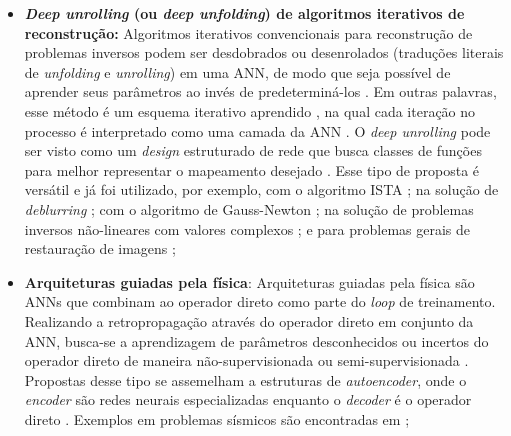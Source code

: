 \begin{itemize}

\item \textbf{\textit{Deep unrolling} (ou \textit{deep unfolding}) de algoritmos iterativos de reconstrução:} Algoritmos iterativos convencionais para reconstrução de problemas inversos podem ser desdobrados ou desenrolados (traduções literais de \textit{unfolding} e \textit{unrolling}) em uma ANN, de modo que seja possível de aprender seus parâmetros ao invés de predeterminá-los \cite{Bai2020, Monga2021}. Em outras palavras, esse método é um esquema iterativo aprendido \cite[Subseção 5.1.4]{Arridge2019}, na qual cada iteração no processo é interpretado como uma camada da ANN \cite{Arridge1}. O \textit{deep unrolling} pode ser visto como um \textit{design} estruturado de rede que busca classes de funções para melhor representar o mapeamento desejado \cite[Seção 4.2]{Bai2020}. Esse tipo de proposta é versátil e já foi utilizado, por exemplo, com o algoritmo ISTA \cite{Zhang2018}; na solução de \textit{deblurring} \cite{Li2019unfolding}; com o algoritmo de Gauss-Newton \cite{Yang2020}; na solução de problemas inversos não-lineares com valores complexos \cite{Takabe2020}; e para problemas gerais de restauração de imagens \cite{Mou2022};

\item \textbf{Arquiteturas guiadas pela física}: Arquiteturas guiadas pela física são ANNs que combinam ao operador direto como parte do \textit{loop} de treinamento. Realizando a retropropagação através do operador direto em conjunto da ANN, busca-se a aprendizagem de parâmetros desconhecidos ou incertos do operador direto de maneira não-supervisionada ou semi-supervisionada \cite{Adler2021}. Propostas desse tipo se assemelham a estruturas de \textit{autoencoder}, onde o \textit{encoder} são redes neurais especializadas enquanto o \textit{decoder} é o operador direto \cite[págs. 112-3]{Adler2021}. Exemplos em problemas sísmicos são encontradas em \cite{Alfarraj2019, Biswas2019};


\end{itemize}
